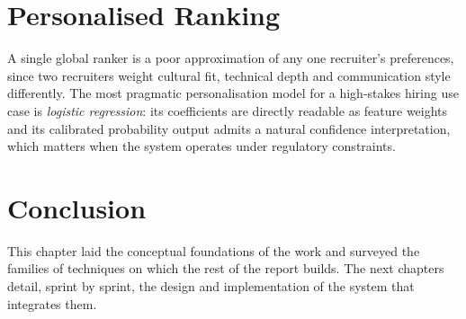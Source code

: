 \section{Personalised Ranking}

A single global ranker is a poor approximation of any one recruiter's
preferences, since two recruiters weight cultural fit, technical depth
and communication style differently. The most pragmatic personalisation
model for a high-stakes hiring use case is \emph{logistic regression}:
its coefficients are directly readable as feature weights and its
calibrated probability output admits a natural confidence
interpretation, which matters when the system operates under
regulatory constraints.

\section{Conclusion}

This chapter laid the conceptual foundations of the work and surveyed
the families of techniques on which the rest of the report builds. The
next chapters detail, sprint by sprint, the design and implementation
of the system that integrates them.
